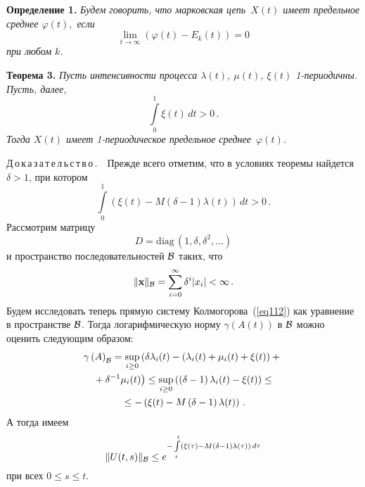 \begin{multicols}{2}
\smallskip

\noindent
\textbf{Определение 1.} 
\textit{Будем говорить, что марковская цепь~$X(t)$ имеет \emph{предельное среднее} $\varphi (t),$ если}
\begin{equation*}
 \lim_{t \to \infty }  \left(\varphi (t) - E_k(t)\right) = 0 
\end{equation*}
\textit{при любом $k$.}

\smallskip


\noindent
\textbf{Теорема 3.}  \label{mean02}
\textit{Пусть интенсивности процесса  $\lambda(t)$, $\mu(t)$, $\xi(t)$
1-периодичны. Пусть, далее,}
\begin{equation}
\int\limits_0^1\xi(t)\, dt >0\,. \label{cat501}
\end{equation}
\textit{Тогда $X(t)$ имеет 1-периодическое предельное среднее~$\varphi (t)$.}


\smallskip

\noindent
Д\,о\,к\,а\,з\,а\,т\,е\,л\,ь\,с\,т\,в\,о\,.\ \, 
Прежде всего отметим, что в условиях теоремы найдется $\delta >1$, при котором
\begin{equation}
\int\limits_0^1\left(\xi(t)- M\left(\delta
-1\right)\lambda(t)\right)\, dt>0\,. 
\label{cat51}
\end{equation}
Рассмотрим матрицу
\begin{equation*}
D=\mathrm{diag}\,\left( 1, \delta, \delta^2,\dots \right)  
\end{equation*}
и пространство последовательностей $\cal B$ таких, что 
$$
\|{\bf x}\|_{\cal B} = \sum\limits_{i=0}^{\infty} \delta^i |x_i| < \infty\,.
$$ 
Будем исследовать теперь прямую систему 
Колмогорова~(\ref{eq112}) как уравнение в пространстве $\cal B$.  Тогда логарифмическую норму  $\gamma
\left(A(t)\right)$ в $\cal B$ можно оценить следующим образом:
\begin{multline*}
\gamma \left(A\right)_{\cal B} = \sup\limits_{i \ge 0} \left(\delta
 \lambda_i(t) - \left(\lambda_i(t) +\mu_i(t)
+\xi(t)\right) +{}\right.\\ 
\left.{}+
\delta^{-1} \mu_i(t) \right) \le 
\sup\limits_{i \ge 0} \left(\left(\delta-1\right)
 \lambda_i(t) -\xi(t)\right) \le {}\\
 {}\le - \left(\xi(t)- M\left(\delta
-1\right)\lambda(t)\right)\,. 
\end{multline*}
А тогда имеем
\begin{equation*}
\|U(t,s)\|_{\cal B} \le  e^{-\int\limits_s^t \left(\xi(\tau)-
M\left(\delta -1\right)\lambda(\tau)\right)\, d\tau} 
\end{equation*}
при всех $0 \le s \le t$.


\end{multicols}
